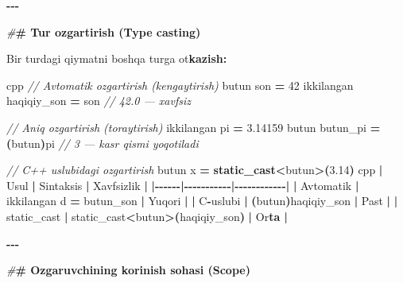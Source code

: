 \documentclass[a4paper,11pt,twoside,openright]{book}
\newenvironment{Shaded}{\begin{snugshade}}{\end{snugshade}}
\newcommand{\CharTok}[1]{\textcolor[rgb]{0.31,0.60,0.02}{#1}}
\newcommand{\CommentTok}[1]{\textcolor[rgb]{0.56,0.35,0.01}{\textit{#1}}}
\newcommand{\DecValTok}[1]{\textcolor[rgb]{0.00,0.00,0.81}{#1}}
\newcommand{\ErrorTok}[1]{\textcolor[rgb]{0.64,0.00,0.00}{\textbf{#1}}}
\newcommand{\FloatTok}[1]{\textcolor[rgb]{0.00,0.00,0.81}{#1}}
\newcommand{\KeywordTok}[1]{\textcolor[rgb]{0.13,0.29,0.53}{\textbf{#1}}}
\newcommand{\NormalTok}[1]{#1}
\newcommand{\OperatorTok}[1]{\textcolor[rgb]{0.81,0.36,0.00}{\textbf{#1}}}
\newcommand{\PreprocessorTok}[1]{\textcolor[rgb]{0.56,0.35,0.01}{\textit{#1}}}
\begin{document}
\begin{Shaded}
\begin{Highlighting}[]
\OperatorTok{{-}{-}{-}}

\PreprocessorTok{\#}\ErrorTok{\# Tur o\textquotesingle{}zgartirish (Type casting)}

\NormalTok{Bir turdagi qiymatni boshqa turga o}\CharTok{\textquotesingle{}t}\ErrorTok{kazish:}

\ErrorTok{\textasciigrave{}\textasciigrave{}\textasciigrave{}}\NormalTok{cpp}
\CommentTok{// Avtomatik o\textquotesingle{}zgartirish (kengaytirish)}
\NormalTok{butun son }\OperatorTok{=} \DecValTok{42}
\NormalTok{ikkilangan haqiqiy\_son }\OperatorTok{=}\NormalTok{ son    }\CommentTok{// 42.0 — xavfsiz}

\CommentTok{// Aniq o\textquotesingle{}zgartirish (toraytirish)}
\NormalTok{ikkilangan pi }\OperatorTok{=} \FloatTok{3.14159}
\NormalTok{butun butun\_pi }\OperatorTok{=} \OperatorTok{(}\NormalTok{butun}\OperatorTok{)}\NormalTok{pi       }\CommentTok{// 3 — kasr qismi yo\textquotesingle{}qotiladi}

\CommentTok{// C++ uslubidagi o\textquotesingle{}zgartirish}
\NormalTok{butun x }\OperatorTok{=} \KeywordTok{static\_cast}\OperatorTok{\textless{}}\NormalTok{butun}\OperatorTok{\textgreater{}(}\FloatTok{3.14}\OperatorTok{)}
\ErrorTok{\textasciigrave{}\textasciigrave{}\textasciigrave{}}\NormalTok{cpp}
\OperatorTok{|}\NormalTok{ Usul }\OperatorTok{|}\NormalTok{ Sintaksis }\OperatorTok{|}\NormalTok{ Xavfsizlik }\OperatorTok{|}
\OperatorTok{|{-}{-}{-}{-}{-}{-}|{-}{-}{-}{-}{-}{-}{-}{-}{-}{-}{-}|{-}{-}{-}{-}{-}{-}{-}{-}{-}{-}{-}{-}|}
\OperatorTok{|}\NormalTok{ Avtomatik }\OperatorTok{|} \ErrorTok{\textasciigrave{}}\NormalTok{ikkilangan d }\OperatorTok{=}\NormalTok{ butun\_son}\ErrorTok{\textasciigrave{}} \OperatorTok{|}\NormalTok{ Yuqori }\OperatorTok{|}
\OperatorTok{|}\NormalTok{ C}\OperatorTok{{-}}\NormalTok{uslubi }\OperatorTok{|} \ErrorTok{\textasciigrave{}}\OperatorTok{(}\NormalTok{butun}\OperatorTok{)}\NormalTok{haqiqiy\_son}\ErrorTok{\textasciigrave{}} \OperatorTok{|}\NormalTok{ Past }\OperatorTok{|}
\OperatorTok{|} \ErrorTok{\textasciigrave{}}\NormalTok{static\_cast}\ErrorTok{\textasciigrave{}} \OperatorTok{|} \ErrorTok{\textasciigrave{}}\NormalTok{static\_cast}\OperatorTok{\textless{}}\NormalTok{butun}\OperatorTok{\textgreater{}(}\NormalTok{haqiqiy\_son}\OperatorTok{)}\ErrorTok{\textasciigrave{}} \OperatorTok{|}\NormalTok{ O}\CharTok{\textquotesingle{}r}\ErrorTok{ta |}

\OperatorTok{{-}{-}{-}}

\PreprocessorTok{\#}\ErrorTok{\# O\textquotesingle{}zgaruvchining ko\textquotesingle{}rinish sohasi (Scope)}


\end{Highlighting}
\end{Shaded}
\end{document}
